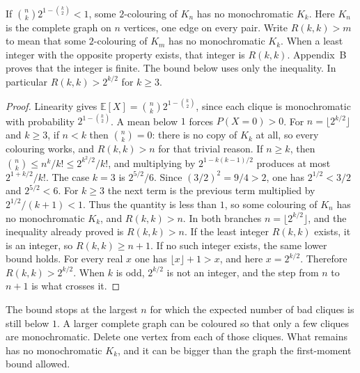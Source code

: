 \begin{theorem}[Erd\H os]\label{thm:erdos}
If $\binom{n}{k}2^{1-\binom{k}{2}}<1$, some $2$-colouring of $K_n$ has no monochromatic $K_k$. Here $K_n$ is the complete graph on $n$ vertices, one edge on every pair. Write $R(k,k)>m$ to mean that some $2$-colouring of $K_m$ has no monochromatic $K_k$. When a least integer with the opposite property exists, that integer is $R(k,k)$. Appendix~B proves that the integer is finite. The bound below uses only the inequality. In particular $R(k,k)>2^{k/2}$ for $k\ge3$.
\end{theorem}
\begin{proof}
Linearity gives $\mathbb E[X]=\binom{n}{k}2^{1-\binom{k}{2}}$, since each clique is monochromatic with probability $2^{1-\binom{k}{2}}$. A mean below $1$ forces $P(X=0)>0$. For $n=\lfloor 2^{k/2}\rfloor$ and $k\ge3$, if $n<k$ then $\binom{n}{k}=0$: there is no copy of $K_k$ at all, so every colouring works, and $R(k,k)>n$ for that trivial reason. If $n\ge k$, then $\binom{n}{k}\le n^k/k!\le 2^{k^2/2}/k!$, and multiplying by $2^{1-k(k-1)/2}$ produces at most $2^{1+k/2}/k!$. The case $k=3$ is $2^{5/2}/6$. Since $(3/2)^2=9/4>2$, one has $2^{1/2}<3/2$ and $2^{5/2}<6$. For $k\ge3$ the next term is the previous term multiplied by $2^{1/2}/(k+1)<1$. Thus the quantity is less than $1$, so some colouring of $K_n$ has no monochromatic $K_k$, and $R(k,k)>n$. In both branches $n=\lfloor 2^{k/2}\rfloor$, and the inequality already proved is $R(k,k)>n$. If the least integer $R(k,k)$ exists, it is an integer, so $R(k,k)\ge n+1$. If no such integer exists, the same lower bound holds. For every real $x$ one has $\lfloor x\rfloor+1>x$, and here $x=2^{k/2}$. Therefore $R(k,k)>2^{k/2}$. When $k$ is odd, $2^{k/2}$ is not an integer, and the step from $n$ to $n+1$ is what crosses it.
\end{proof}

The bound stops at the largest $n$ for which the expected number of bad cliques is still below $1$. A larger complete graph can be coloured so that only a few cliques are monochromatic. Delete one vertex from each of those cliques. What remains has no monochromatic $K_k$, and it can be bigger than the graph the first-moment bound allowed.

